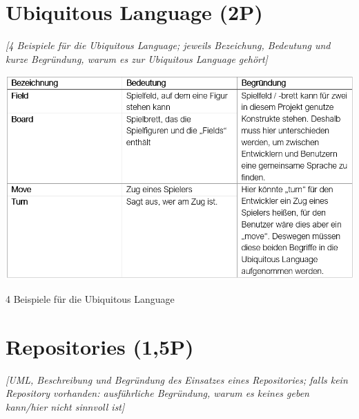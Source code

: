\section{Ubiquitous Language (2P)}
\emph{[4 Beispiele für die Ubiquitous Language; jeweils Bezeichung, Bedeutung und kurze Begründung,
warum es zur Ubiquitous Language gehört]}

\begin{table}[htbp]
\centering
\centerline{\includegraphics[scale=.7]{ubiquitous}}
\caption{4 Beispiele für die Ubiquitous Language}
\label{tab:ubiquitous}
\end{table}



\newpage

\section{Repositories (1,5P)}
\emph{[UML, Beschreibung und Begründung des Einsatzes eines Repositories; falls kein Repository
vorhanden: ausführliche Begründung, warum es keines geben kann/hier nicht sinnvoll ist]}

